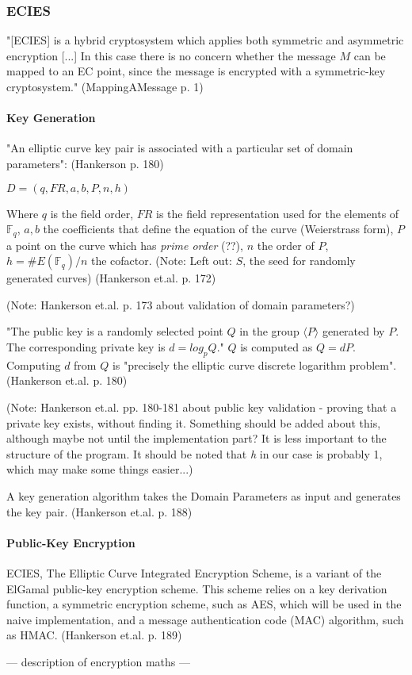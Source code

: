 \subsubsection{ECIES}

"[ECIES] is a hybrid cryptosystem which applies both symmetric and asymmetric encryption [...] In this case
there is no concern whether the message \(M\) can be mapped to an EC point, since the message is encrypted
with a symmetric-key cryptosystem." (MappingAMessage p. 1)

\paragraph{Key Generation}

"An elliptic curve key pair is associated with a particular set of domain parameters": (Hankerson p. 180)

\( D = (q,FR,a,b,P,n,h) \)

Where \(q\) is the field order, \(FR\) is the field representation used for the elements of \( \mathbb{ F }_q \),
\(a, b\) the coefficients that define the equation of the curve (Weierstrass form), \(P\) a point on the curve which
has \emph{prime order} (??), \(n\) the order of \(P\), \(h = \#E(\mathbb{F}_q) / n\) the cofactor. (Note: Left out:
\(S\), the seed for randomly generated curves) (Hankerson et.al. p. 172)

(Note: Hankerson et.al. p. 173 about validation of domain parameters?)

"The public key is a randomly selected point \(Q\) in the group \( \langle P \rangle \) generated by \(P\). The corresponding
private key is \(d = log_p Q\)." \(Q\) is computed as \(Q = dP\). Computing \(d\) from \(Q\) is "precisely the elliptic curve
discrete logarithm problem". (Hankerson et.al. p. 180)

(Note: Hankerson et.al. pp. 180-181 about public key validation - proving that a private key exists, without finding it. Something
should be added about this, although maybe not until the implementation part? It is less important to the structure of the program.
It should be noted that \emph{h} in our case is probably 1, which may make some things easier...)

A key generation algorithm takes the Domain Parameters as input and generates the key pair. (Hankerson et.al. p. 188)

\paragraph{Public-Key Encryption}

ECIES, The Elliptic Curve Integrated Encryption Scheme, is a variant of the ElGamal public-key encryption scheme. This scheme relies
on a key derivation function, a symmetric encryption scheme, such as AES, which will be used in the naive implementation, and a
message authentication code (MAC) algorithm, such as HMAC. (Hankerson et.al. p. 189)

--- description of encryption maths ---
